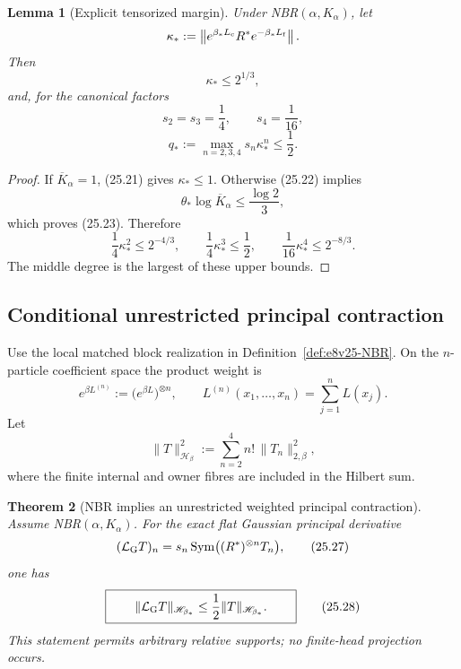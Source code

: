 \documentclass[11pt,oneside]{book}
\newtheorem{theorem}{Theorem}[chapter]
\newtheorem{lemma}[theorem]{Lemma}
\theoremstyle{definition}
\theoremstyle{remark}
\begin{document}
\begin{lemma}[Explicit tensorized margin]
\label{lem:e8v25-tensor-margin}
Under NBR\((\alpha,K_\alpha)\), let
\[
 \kappa_*:=
 \left\|e^{\beta_*L_{\rm c}}R^*
              e^{-\beta_*L_{\rm f}}\right\| .
\]
Then
\[
                         \kappa_*\leq2^{1/3},                     \tag{25.23}
\]
and, for the canonical factors
\[
                 s_2=s_3=\frac14,\qquad s_4=\frac1{16},
\]
\[
\boxed{\qquad
 q_*:=\max_{n=2,3,4}s_n\kappa_*^n\leq\frac12 .
\qquad}                                                           \tag{25.24}
\]
\end{lemma}

\begin{proof}
If \(\overline K_\alpha=1\), (25.21) gives
\(\kappa_*\leq1\).  Otherwise (25.22) implies
\[
 \theta_*\log\overline K_\alpha\leq\frac{\log2}{3},
\]
which proves (25.23).  Therefore
\[
 \frac14\kappa_*^2\leq2^{-4/3},\qquad
 \frac14\kappa_*^3\leq\frac12,\qquad
 \frac1{16}\kappa_*^4\leq2^{-8/3}.
\]
The middle degree is the largest of these upper bounds.
\end{proof}

\subsection{Conditional unrestricted principal contraction}

Use the local matched block realization in
Definition~\ref{def:e8v25-NBR}.  On the \(n\)-particle coefficient
space the product weight is
\[
 e^{\beta L^{(n)}}:=
 \bigl(e^{\beta L}\bigr)^{\otimes n},\qquad
 L^{(n)}(x_1,\ldots,x_n)=\sum_{j=1}^nL(x_j).                      \tag{25.25}
\]
Let
\[
 \|T\|_{\mathscr H_{\beta}}^2
 :=\sum_{n=2}^4 n!\,\|T_n\|_{2,\beta}^2,                          \tag{25.26}
\]
where the finite internal and owner fibres are included in the
Hilbert sum.

\begin{theorem}[NBR implies an unrestricted weighted principal
contraction]
\label{thm:e8v25-principal}
Assume NBR\((\alpha,K_\alpha)\).  For the exact flat Gaussian
principal derivative
\[
 (\mathcal L_{\rm G}T)_n
 =s_n\,{\rm Sym}\bigl((R^*)^{\otimes n}T_n\bigr),                 \tag{25.27}
\]
one has
\[
\boxed{\qquad
       \|\mathcal L_{\rm G}T\|_{\mathscr H_{\beta_*}}
       \leq\frac12\|T\|_{\mathscr H_{\beta_*}} .
\qquad}                                                           \tag{25.28}
\]
This statement permits arbitrary relative supports; no finite-head
projection occurs.
\end{theorem}
\end{document}
